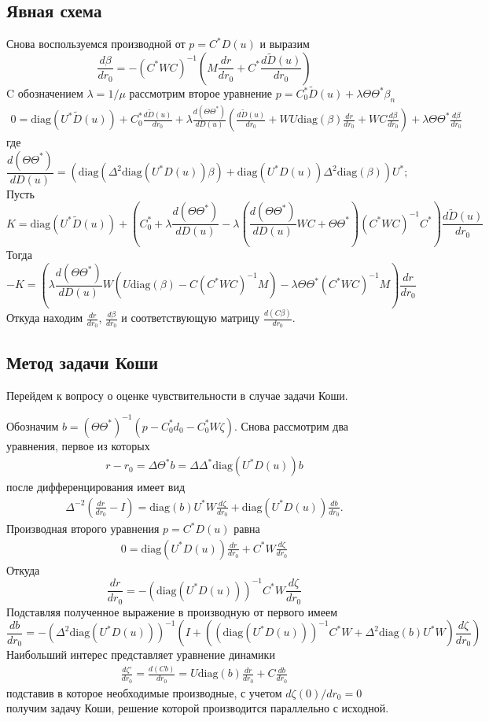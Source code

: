 \documentclass[10pt]{article}
\theoremstyle{definition}
\theoremstyle{remark}
\theoremstyle{plain}
\newcommand{\wt}{\widetilde}
\newcommand{\diag}{\mathrm{diag}}
\begin{document}
\subsection{Явная схема}
Снова воспользуемся производной от $p = C^*D(u)$ и выразим
$$
\frac{d\beta}{dr_0} = -(C^*WC)^{-1}\left(M\frac{dr}{dr_0}+ C^*\frac{d\wt{D}(u)}{dr_0}\right)
$$
C обозначением $\lambda= 1/\mu$ рассмотрим второе уравнение  $p =C^*_0 \wt{D}(u) + \lambda\Theta\Theta^* \beta_n$
\begin{align*}
0 = \diag(U^*\wt{D}(u))+ C_0^*\frac{d\wt{D}(u)}{dr_0}+
\lambda\frac{d(\Theta\Theta^*)}{dD(u)}
\left( \frac{d\wt{D}(u)}{dr_0}+WU\diag(\beta)\frac{dr}{dr_0}+WC\frac{d\beta}{dr_0} \right)
+\lambda\Theta\Theta^*\frac{d\beta}{dr_0}
\end{align*}
где 
$$
\frac{d(\Theta\Theta^*)}{dD(u)} = \left( \diag(\Delta^2\diag(U^*D(u))\beta)+\diag(U^*D(u))\Delta^2\diag(\beta) \right)U^*;
$$
Пусть 
$$
K = \diag(U^*\wt{D}(u))+ 
\left(
	C_0^*+
	\lambda\frac{d(\Theta\Theta^*)}{dD(u)}
	-\lambda\left(\frac{d(\Theta\Theta^*)}{dD(u)}WC+\Theta\Theta^*\right)(C^*WC)^{-1}C^*
\right)
\frac{d\wt{D}(u)}{dr_0}
$$
Тогда 
$$
-K = \left(\lambda\frac{d(\Theta\Theta^*)}{dD(u)}W
(U\diag(\beta)-C(C^*WC)^{-1}M) - \lambda\Theta\Theta^*(C^*WC)^{-1}M\right)\frac{dr}{dr_0}
$$
Откуда находим $\frac{dr}{dr_0}$, $\frac{d\beta}{dr_0}$ и соответствующую матрицу $\frac{d(C\beta)}{dr_0}$.
\subsection{Метод задачи Коши}
Перейдем к вопросу о оценке чувствительности в случае задачи Коши.

Обозначим $b = (\Theta\Theta^*)^{-1}(p - C_0^*d_0 - C_0^*W\zeta)$. Снова рассмотрим два уравнения, первое из которых
\begin{align*}
r -r_0= \Delta\Theta^*b = \Delta\Delta^*\diag(U^*D(u))b
\end{align*}
после дифференцирования имеет вид
\begin{align*}
\Delta^{-2}\left(\frac{dr}{dr_0} - I\right) = \diag(b)U^*W\frac{d\zeta}{dr_0}+ \diag(U^*D(u))\frac{db}{dr_0}.
\end{align*}
Производная второго уравнения $p = C^*D(u)$  равна
\begin{align*}
0 = \diag(U^*D(u))\frac{dr}{dr_0} + C^*W\frac{d\zeta}{dr_0}
\end{align*}
Откуда 
$$
\frac{dr}{dr_0} = - \left(\diag(U^*D(u))\right)^{-1} C^*W\frac{d\zeta}{dr_0}
$$
Подставляя полученное выражение в производную от первого имеем
$$
\frac{db}{dr_0} = -\left(\Delta^2\diag(U^*D(u))\right)^{-1}
\left(I + \left((\diag(U^*D(u)))^{-1} C^*W + \Delta^2\diag(b)U^*W\right)\frac{d\zeta}{dr_0}\right)
$$
Наибольший интерес представляет уравнение динамики
\begin{align}
\frac{d\zeta'}{dr_0} = \frac{d(Cb)}{dr_0} = U\diag(b)\frac{dr}{dr_0}+C\frac{db}{dr_0}
\end{align}
подставив в которое необходимые производные, с учетом $d\zeta(0)/dr_0 = 0$ получим задачу Коши, решение которой производится параллельно с исходной.
\end{document}
